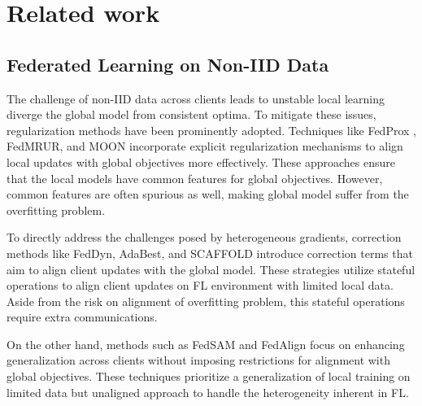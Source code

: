 \documentclass{article}
\theoremstyle{plain}
\theoremstyle{definition}
\theoremstyle{remark}
\begin{document}
\section{Related work}
\subsection{Federated Learning on Non-IID Data}
 The challenge of non-IID data across clients leads to unstable local learning diverge the global model from consistent optima. To mitigate these issues, regularization methods have been prominently adopted. Techniques like FedProx \cite{fedprox}, FedMRUR\cite{fedmrur}, and MOON\cite{moon} incorporate explicit regularization mechanisms to align local updates with global objectives more effectively. These approaches ensure that the local models have common features for global objectives.  However, common features are often spurious as well, making global model suffer from the overfitting problem.

To directly address the challenges posed by heterogeneous gradients, correction methods like FedDyn\cite{feddyn}, AdaBest\cite{adabest}, and SCAFFOLD\cite{scaffold} introduce correction terms that aim to align client updates with the global model. These strategies utilize stateful operations to align client updates on FL environment with limited local data. Aside from the risk on alignment of overfitting problem, this stateful operations require extra communications.

On the other hand, methods such as FedSAM\cite{fedsam} and FedAlign\cite{fedalign} focus on enhancing generalization across clients without imposing restrictions for alignment with global objectives. These techniques prioritize a generalization of local training on limited data but unaligned approach to handle the heterogeneity inherent in FL.
\end{document}
